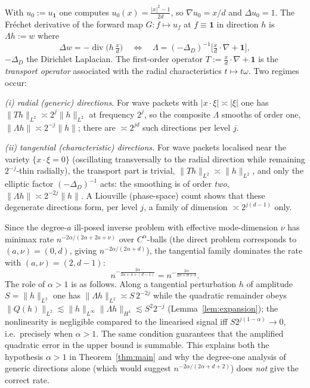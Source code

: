 \documentclass[11pt]{amsart}
\newcommand{\1}{\mathbf{1}}
\newcommand{\divop}{\operatorname{div}}
\begin{document}
With $u_0:=u_{\1}$ one computes $u_0(x)=\frac{|x|^2-1}{2d}$, so
$\nabla u_0=x/d$ and $\Delta u_0=1$. The Fr\'echet derivative of the forward
map $G:f\mapsto u_f$ at $f\equiv\1$ in direction $h$ is
$\Lambda h:=w$ where
\begin{equation}\label{eq:lin-intro}
\Delta w=-\divop\big(h\,\tfrac{x}{d}\big)
\quad\Longleftrightarrow\quad
\Lambda=( -\Delta_D)^{-1}\Big[\tfrac{x}{d}\cdot\nabla+\1\Big],
\end{equation}
$-\Delta_D$ the Dirichlet Laplacian. The first-order operator
$T:=\tfrac{x}{d}\cdot\nabla+\1$ is the \emph{transport operator} associated
with the radial characteristics $t\mapsto t\omega$. Two regimes occur:

\smallskip
\noindent\emph{(i) radial (generic) directions.} For wave packets with
$|x\cdot\xi|\asymp |\xi|$ one has $\|Th\|_{L^2}\asymp 2^{j}\|h\|_{L^2}$ at
frequency $2^j$, so the composite $\Lambda$ smooths of order one,
$\|\Lambda h\|\asymp 2^{-j}\|h\|$; there are $\asymp 2^{jd}$ such directions
per level $j$.

\smallskip
\noindent\emph{(ii) tangential (characteristic) directions.} For wave packets
localised near the variety $\{x\cdot\xi=0\}$ (oscillating transversally to the
radial direction while remaining $2^{-j}$-thin radially), the transport part
is trivial, $\|Th\|_{L^2}\asymp\|h\|_{L^2}$, and only the elliptic factor
$(-\Delta_D)^{-1}$ acts: the smoothing is of order \emph{two},
$\|\Lambda h\|\asymp 2^{-2j}\|h\|$. A Liouville (phase-space) count shows that
these degenerate directions form, per level $j$, a family of dimension
$\asymp 2^{j(d-1)}$ only.

\smallskip
Since the degree-$a$ ill-posed inverse problem with effective mode-dimension
$\nu$ has minimax rate $n^{-2\alpha/(2\alpha+2a+\nu)}$ over $C^\alpha$-balls
(the direct problem corresponds to $(a,\nu)=(0,d)$, giving
$n^{-2\alpha/(2\alpha+d)}$), the tangential family dominates the rate with
$(a,\nu)=(2,d-1)$:
\[
n^{-\frac{2\alpha}{2\alpha+4+(d-1)}}=n^{-\frac{2\alpha}{2\alpha+d+3}} .
\]
The role of $\alpha>1$ is as follows. Along a tangential perturbation $h$ of
amplitude $S=\|h\|_{L^2}$ one has $\|\Lambda h\|_{L^2}\asymp S\,2^{-2j}$ while
the quadratic remainder obeys $\|Q(h)\|_{L^2}\lesssim \|h\|_{L^\infty}
\|\Lambda h\|_{H^1}\lesssim S^2 2^{-j}$ (Lemma~\ref{lem:expansion}); the
nonlinearity is negligible compared to the linearised signal iff
$S2^{j(1-\alpha)}\to0$, i.e.\ precisely when $\alpha>1$. The same condition
guarantees that the amplified quadratic error in the upper bound is
summable. This explains both the hypothesis $\alpha>1$ in
Theorem~\ref{thm:main} and why the degree-one analysis of generic directions
alone (which would suggest $n^{-2\alpha/(2\alpha+d+2)}$) does \emph{not}
give the correct rate.
\end{document}

